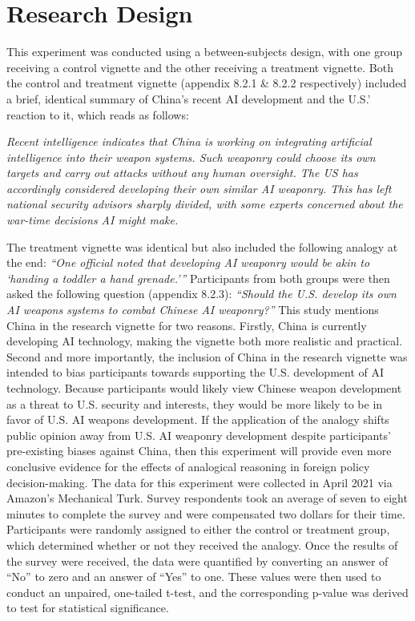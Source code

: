 \documentclass[12pt]{article}
\begin{document}
\section {Research Design}
This experiment was conducted using a between-subjects design, with one group receiving a control vignette and the other receiving a treatment vignette. Both the control and treatment vignette (appendix 8.2.1 \& 8.2.2 respectively) included a brief, identical summary of China’s recent AI development and the U.S.’ reaction to it, which reads as follows:

\begin{displayquote}
\textit{Recent intelligence indicates that China is working on integrating artificial intelligence into their weapon systems. Such weaponry could choose its own targets and carry out attacks without any human oversight. The US has accordingly considered developing their own similar AI weaponry. This has left national security advisors sharply divided, with some experts concerned about the war-time decisions AI might make.}
\end {displayquote}
The treatment vignette was identical but also included the following analogy at the end: \textit{“One official noted that developing AI weaponry would be akin to ‘handing a toddler a hand grenade.’”} Participants from both groups were then asked the following question (appendix 8.2.3): \textit{“Should the U.S. develop its own AI weapons systems to combat Chinese AI weaponry?”}
\bigbreak
This study mentions China in the research vignette for two reasons. Firstly, China is currently developing AI technology, making the vignette both more realistic and practical. Second and more importantly, the inclusion of China in the research vignette was intended to bias participants towards supporting the U.S. development of AI technology. Because participants would likely view Chinese weapon development as a threat to U.S. security and interests, they would be more likely to be in favor of U.S. AI weapons development. If the application of the analogy shifts public opinion away from U.S. AI weaponry development despite participants’ pre-existing biases against China, then this experiment will provide even more conclusive evidence for the effects of analogical reasoning in foreign policy decision-making. 
\bigbreak
The data for this experiment were collected in April 2021 via Amazon’s Mechanical Turk. Survey respondents took an average of seven to eight minutes to complete the survey and were compensated two dollars for their time. Participants were randomly assigned to either the control or treatment group, which determined whether or not they received the analogy. Once the results of the survey were received, the data were quantified by converting an answer of “No” to zero and an answer of “Yes” to one. These values were then used to conduct an unpaired, one-tailed t-test, and the corresponding p-value was derived to test for statistical significance.
\end{document}
